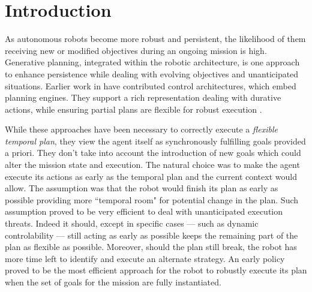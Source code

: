 \section{Introduction}
\label{sec:intro}

As autonomous robots become more robust and persistent, the likelihood
of them receiving new or modified objectives during an ongoing
mission is high. Generative planning, integrated within the robotic
architecture, is one approach to enhance
persistence while dealing with evolving objectives and unanticipated situations.  Earlier work in
\cite{AmbrosIngerson88,Haigh98,alami:1998p820,mus98,chien99,mus04,py10}
have contributed control architectures, which embed planning engines.
They support a rich representation dealing with durative
actions, while ensuring partial plans are flexible for robust execution
\cite{lemai-chenevier2004}.


While these approaches have been necessary to correctly execute a
\emph{flexible temporal plan}, they view the agent itself as
synchronously fulfilling goals provided a priori. They don't take into account the
introduction of new goals which could alter the mission state and
execution.
The natural choice was to make the agent execute its actions as early
as the temporal plan and the current context would allow. The
assumption was that the robot would finish its plan as early as possible
providing more ``temporal room" for potential change in the plan. Such
assumption proved to be very efficient to deal with unanticipated
execution threats. Indeed it should, except in specific cases  --- such as
dynamic controlability \cite{morris01} ---  still acting as early
as possible keeps the remaining part of the plan as flexible as
possible. Moreover, should the plan still break, the robot has more
time left to identify and execute an alternate strategy. An early policy proved to
be the most efficient approach for the robot to robustly execute its
plan when the set of goals for the mission are fully instantiated.

